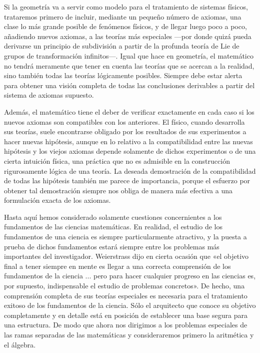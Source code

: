 \documentclass[a4paper, 12pt]{article}
\begin{document}
Si la geometría va a servir como modelo para el tratamiento de sistemas físicos, trataremos primero de incluir, mediante un pequeño número de axiomas, una clase lo más grande posible de fenómenos físicos, y de llegar luego poco a poco, añadiendo nuevos axiomas, a las teorías más especiales ---por donde quizá pueda derivarse un principio de subdivisión a partir de la profunda teoría de Lie de grupos de transformación infinitos---. Igual que hace en geometría, el matemático no tendrá meramente que tener en cuenta las teorías que se acercan a la realidad, sino  también todas las teorías lógicamente posibles. Siempre debe estar alerta para obtener una visión completa de todas las conclusiones derivables a partir del sistema de axiomas supuesto.

 Además, el matemático tiene el deber de verificar exactamente en  cada caso si los nuevos axiomas son compatibles con los anteriores. El físico, cuando desarrolla sus teorías, suele  encontrarse   obligado por los resultados de sus experimentos a hacer nuevas hipótesis, aunque en lo relativo a la compatibilidad entre las nuevas hipótesis y los viejos axiomas depende solamente de dichos experimentos o de una cierta intuición  física, una práctica que no es admisible en la construcción rigurosamente lógica de una teoría. La deseada demostración de la compatibilidad de todas las hipótesis también me parece de importancia, porque el esfuerzo por obtener tal demostración siempre nos obliga de manera más efectiva a una formulación exacta de los axiomas. 
  
Hasta aquí hemos considerado solamente cuestiones concernientes a los fundamentos de las ciencias matemáticas. En realidad, el estudio de los fundamentos de una ciencia es siempre particularmente atractivo, y la puesta a prueba de dichos fundamentos estará siempre entre los problemas más importantes del investigador. Weierstrass dijo en cierta ocasión que «el objetivo final a tener siempre en mente es llegar a una correcta comprensión de los fundamentos de la ciencia  ... 
  pero para hacer cualquier progreso en las ciencias es, por supuesto, indispensable el estudio de problemas concretos». De hecho, una comprensión completa de  sus teorías especiales es necesaria para el tratamiento exitoso de los fundamentos de la ciencia. Sólo el arquitecto que conoce su objetivo completamente y en detalle está en posición de establecer una base segura para una estructura. De modo que ahora nos dirigimos a los problemas especiales de las ramas separadas de las matemáticas y consideraremos  primero la aritmética y el álgebra. 
  
\end{document}
